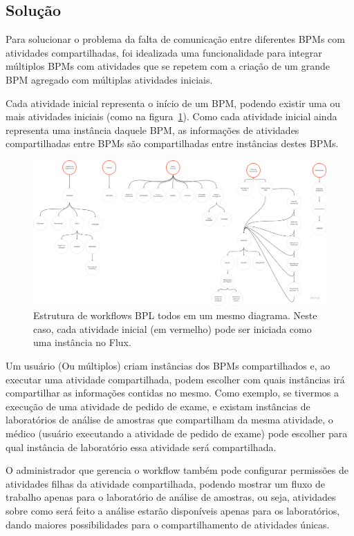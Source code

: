 \subsection{Solução}

Para solucionar o problema da falta de comunicação entre diferentes BPMs com atividades compartilhadas, foi idealizada uma funcionalidade para integrar múltiplos BPMs com atividades que se repetem com a criação de um grande BPM agregado com múltiplas atividades iniciais.

Cada atividade inicial representa o início de um BPM, podendo existir uma ou mais atividades iniciais (como na figura~\ref{fig:bpl_completo}).
Como cada atividade inicial ainda representa uma instância daquele BPM, as informações de atividades compartilhadas entre BPMs são compartilhadas entre instâncias destes BPMs.

\begin{figure}
    \centering
    \includegraphics[width=1\textwidth]{imgs/BPL/bpl_completo.png}
    \caption{Estrutura de workflows BPL todos em um mesmo diagrama. Neste caso, cada atividade inicial (em vermelho) pode ser iniciada como uma instância no Flux.}
    \label{fig:bpl_completo}
\end{figure}

Um usuário (Ou múltiplos) criam instâncias dos BPMs compartilhados e, ao executar uma atividade compartilhada, podem escolher com quais instâncias irá compartilhar as informações contidas no mesmo.
Como exemplo, se tivermos a execução de uma atividade de pedido de exame, e existam instâncias de laboratórios de análise de amostras que compartilham da mesma atividade, o médico (usuário executando a atividade de pedido de exame) pode escolher para qual instância de laboratório essa atividade será compartilhada.

O administrador que gerencia o workflow também pode configurar permissões de atividades filhas da atividade compartilhada, podendo mostrar um fluxo de trabalho apenas para o laboratório de análise de amostras, ou seja, atividades sobre como será feito a análise estarão disponíveis apenas para os laboratórios, dando maiores possibilidades para o compartilhamento de atividades únicas.

